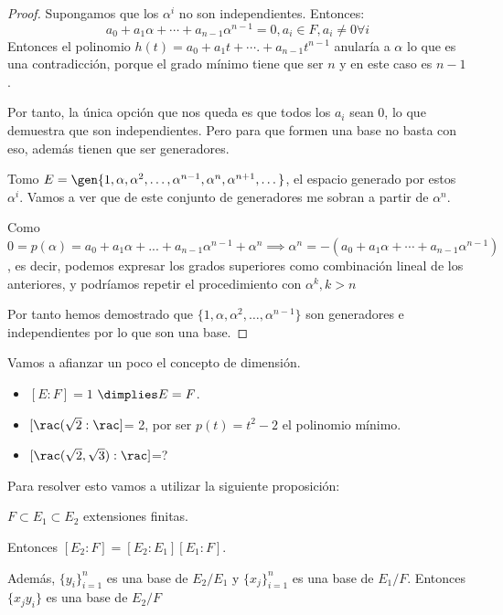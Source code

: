 \documentclass{apuntes}
\begin{document}
\begin{proof}
Supongamos que los $α^i$ no son independientes. Entonces:
\[a_0 + a_1\alpha + \dotsb + a_{n-1}\alpha^{n-1} = 0, a_i\in F, a_i \neq 0 \forall i\]
Entonces el polinomio $h(t) = a_0 + a_1t + \dotsb. + a_{n-1}t^{n-1}$ anularía a $\alpha$ lo que es una contradicción, porque el grado mínimo tiene que ser $n$ y en este caso es $n-1$.

Por tanto, la única opción que nos queda es que todos los $a_i$ sean 0, lo que demuestra que son independientes. Pero para que formen una base no basta con eso, además tienen que ser generadores.

Tomo $E=\gen{1,\alpha,\alpha^2,\dotsc,\alpha^{n-1},\alpha^{n},\alpha^{n+1},\dotsc}$, el espacio generado por estos $α^i$. Vamos a ver que de este conjunto de generadores me sobran a partir de $\alpha^n$.

Como $0 = p(\alpha) = a_0 + a_1\alpha + ... + a_{n-1}\alpha^{n-1} + \alpha^n \implies \alpha^n = -(a_0 + a_1\alpha + \dotsb + a_{n-1}\alpha^{n-1})$, es decir, podemos expresar los grados superiores como combinación lineal de los anteriores, y podríamos repetir el procedimiento con $α^k, k>n$

Por tanto hemos demostrado que  $\{1,\alpha,\alpha^2,\dotsc,\alpha^{n-1}\}$ son generadores e independientes por lo que son una base.
\end{proof}

Vamos a afianzar un poco el concepto de dimensión.
\begin{example}
\begin{itemize}
\item $[E:F] = 1$ $\dimplies E=F$.
\item $[\rac(\sqrt{2} : \rac]$= 2, por ser $p(t) = t^2 -2$ el polinomio mínimo.
\item $[\rac (\sqrt{2},\sqrt{3}) %
:\rac]$=?
\end{itemize}
\end{example}

Para resolver esto vamos a utilizar la siguiente proposición:

\begin{prop}
$F \subset E_1 \subset E_2$ extensiones finitas.

Entonces $[E_2 : F] = [E_2 : E_1][E_1 : F]$.

Además, $\{y_i\}_{i=1}^n$ es una base de $E_2 / E_1$ y $\{x_j\}_{i=1}^n$  es una base de $E_1 / F$. Entonces $\{x_jy_i\}$ es una base de $E_2/F$
\end{prop}
\end{document}

